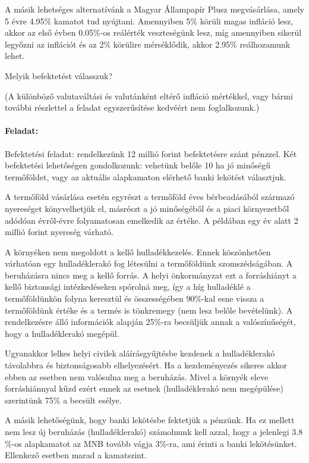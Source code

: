 \documentclass[a4paper,12pt]{article}
\begin{document}
A másik lehetséges alternatívánk a Magyar Állampapír Plusz megvásárlása, amely 5 évre 4.95$\%$ kamatot tud nyújtani. Amennyiben 5$\%$ körüli magas infláció lesz, akkor az első évben 0.05$\%$-os reálérték veszteségünk lesz, míg amennyiben sikerül legyőzni az inflációt és az 2$\%$ körülire mérséklődik, akkor 2.95$\%$ reálhozamunk lehet.

Melyik befektetést válasszuk?


(A különböző valutaváltási és valutánként eltérő infláció mértékkel, vagy bármi további részlettel a feladat egyszerűsítése kedvéért nem foglalkozunk.)


\paragraph{Feladat:} Befektetési feladat: rendelkezünk 12 millió forint befektetésre szánt pénzzel. Két befektetési lehetőségen gondolkozunk: vehetünk belőle 10 ha jó minőségű termőföldet, vagy az aktuális alapkamaton elérhető banki lekötést választjuk.

A termőföld vásárlása esetén egyrészt a termőföld éves bérbeadásából származó nyereséget könyvelhetjük el, másrészt a jó minőségéből és a piaci környezetből adódóan évről-évre folyamatosan emelkedik az értéke. A példában egy év alatt 2 millió forint nyereség várható.

A környéken nem megoldott a kellő hulladékkezelés. Ennek köszönhetően várhatóan egy hulladéklerakó fog létesülni a termőföldünk szomszédságában. A beruházásra nincs meg a kellő forrás. A helyi önkormányzat ezt a forráshiányt a kellő biztonsági intézkedéseken spórolná meg, így a híg hulladéklé a termőföldünkön folyna keresztül és összességében 90$\%$-kal esne vissza a termőföldünk értéke és a termés is tönkremegy (nem lesz belőle bevételünk). A rendelkezésre álló információk alapján 25$\%$-ra becsüljük annak a valószínűségét, hogy a hulladéklerakó megépül. 

Ugyanakkor lelkes helyi civilek aláírásgyűjtésbe kezdenek a hulladéklerakó távolabbra és biztonságosabb elhelyezésért. Ha a kezdeményezés sikeres akkor ebben az esetben nem valósulna meg a beruházás. Mivel a környék eleve forráshiánnyal kűzd ezért ennek az esetnek (hulladéklerakó nem megépülése) szerintünk 75$\%$ a becsült esélye. 

A másik lehetőségünk, hogy banki lekötésbe fektetjük a pénzünk. Ha ez mellett nem lesz új beruházás (hulladéklerakó) számolnunk kell azzal, hogy a jelenlegi 3.8$\%$-os alapkamatot az MNB tovább vágja 3$\%$-ra, ami érinti a banki lekötésünket. Ellenkező esetben marad a kamatszint.
\end{document}
